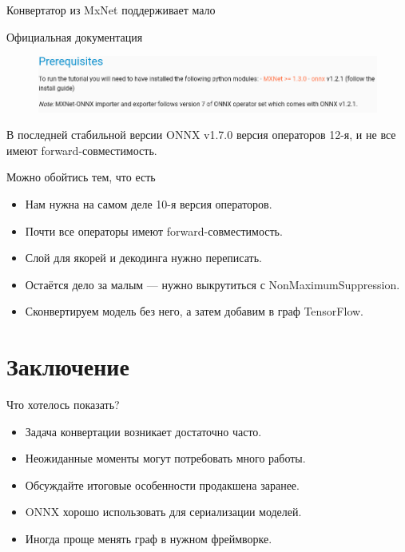 \documentclass[mathserif,serif,unicode]{beamer}
\begin{document}
\begin{frame}{Конвертатор из MxNet поддерживает мало}

\begin{block}{Официальная документация}
    \begin{figure}
        \centering
        \includegraphics[width=\textwidth]{images/mxnet_onnx.png}
    \end{figure}
\end{block}
\vspace{5mm}
В последней стабильной версии ONNX v1.7.0 версия операторов 12-я, и не все имеют forward-совместимость.
    
\end{frame}

\begin{frame}{Можно обойтись тем, что есть}

\begin{itemize}
    \item<1-> Нам нужна на самом деле 10-я версия операторов.
    \item<1-> Почти все операторы имеют forward-совместимость.
    \item<1-> Слой для якорей и декодинга нужно переписать.
    \item<1-> Остаётся дело за малым --- нужно выкрутиться с NonMaximumSuppression.
    \item<2-> Сконвертируем модель без него, а затем добавим в граф TensorFlow.
\end{itemize}
    
\end{frame}

\section{Заключение}

\begin{frame}{Что хотелось показать?}

\begin{itemize}
    \item Задача конвертации возникает достаточно часто.
    \item Неожиданные моменты могут потребовать много работы.
    \item Обсуждайте итоговые особенности продакшена заранее.
    \item ONNX хорошо использовать для сериализации моделей.
    \item Иногда проще менять граф в нужном фреймворке.
\end{itemize}
    
\end{frame}
\end{document}
